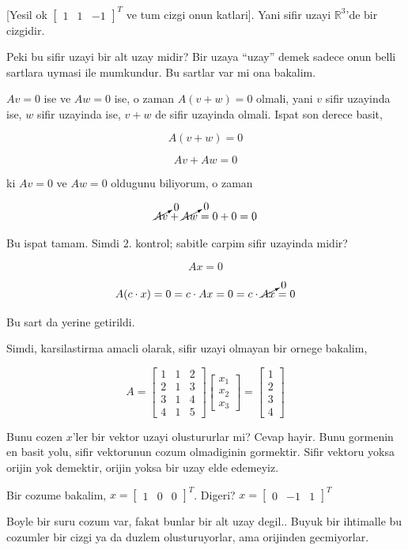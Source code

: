 \documentclass[12pt,fleqn]{article}\usepackage{../common}
\begin{document}
[Yesil ok $\left[\begin{array}{rrr}1 & 1 & -1\end{array}\right]^T$ ve tum
cizgi onun katlari]. Yani sifir uzayi $\mathbb{R}^3$'de bir cizgidir. 

Peki bu sifir uzayi bir alt uzay midir? Bir uzaya ``uzay'' demek sadece
onun belli sartlara uymasi ile mumkundur. Bu sartlar var mi ona bakalim.

$Av=0$ ise ve $Aw=0$ ise, o zaman $A(v+w)=0$ olmali, yani $v$ sifir
uzayinda ise, $w$ sifir uzayinda ise, $v+w$ de sifir uzayinda olmali. Ispat
son derece basit, 

$$ A(v+w) = 0 $$

$$ Av + Aw = 0 $$

ki $Av=0$ ve $Aw=0$ oldugunu biliyorum, o zaman 

$$ \cancelto{0}{Av} + \cancelto{0}{Aw} = 0 + 0 = 0 $$

Bu ispat tamam. Simdi 2. kontrol; sabitle carpim sifir uzayinda midir? 

$$ Ax = 0  $$

$$ A(c \cdot x) = 0  = c \cdot Ax = 0 = c \cdot \cancelto{0}{Ax} = 0$$

Bu sart da yerine getirildi. 

Simdi, karsilastirma amacli olarak, sifir uzayi olmayan bir ornege bakalim,

$$ A = 
\left[\begin{array}{rrr}
1 & 1 & 2 \\
2 & 1 & 3 \\
3 & 1 & 4 \\
4 & 1 & 5 
\end{array}\right]
\left[\begin{array}{r}
x_1  \\
x_2  \\
x_3  
\end{array}\right] 
=
\left[\begin{array}{r}
1  \\
2  \\
3  \\
4  
\end{array}\right]
 $$

Bunu cozen $x$'ler bir vektor uzayi olustururlar mi? Cevap hayir. Bunu
gormenin en basit yolu, sifir vektorunun cozum olmadiginin
gormektir. Sifir vektoru yoksa orijin yok demektir, orijin yoksa bir uzay
elde edemeyiz. 

Bir cozume bakalim, $x = \left[\begin{array}{rrr}
     1&0&0 \end{array}\right]^T$. Digeri? $x = \left[\begin{array}{rrr} 0&-1&1 \end{array}\right]^T$

Boyle bir suru cozum var, fakat bunlar bir alt uzay degil.. Buyuk bir
ihtimalle bu cozumler bir cizgi ya da duzlem olusturuyorlar, ama orijinden 
gecmiyorlar. 
\end{document}
